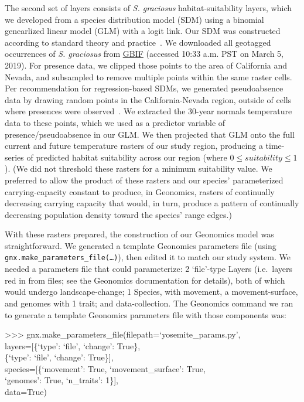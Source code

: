 ﻿\documentclass{article}
\newenvironment{allintypewriter}{\ttfamily}{\par}
\begin{document}
The second set of layers consists of \emph{S. graciosus} habitat-suitability layers, which
we developed from a species distribution model (SDM) using a
binomial genearlized linear model (GLM) with a logit link.
Our SDM was constructed according to standard theory and practice~\cite{peterson}.
We downloaded all geotagged occurrences of \emph{S. graciosus} from \href{https://www.gbif.org}{GBIF}
(accessed 10:33 a.m. PST on March 5, 2019).
For presence data, we clipped those points to the area of California and Nevada,
and subsampled to remove multiple points within the same raster cells.
Per recommendation for regression-based SDMs, we generated pseudoabsence data by drawing random points
in the California-Nevada region, outside of cells where presences were observed~\cite{barbet-massin}.
We extracted the 30-year normals temperature data to these points, which we used as a predictor
variable of presence/pseudoabsence in our GLM.
We then projected that GLM onto the full current and future temperature rasters of our study region,
producing a time-series of predicted habitat suitability across our region
(where $0 \leq suitability \leq 1$).
(We did not threshold these rasters for a minimum suitability value.
We preferred to allow the product of these rasters and our species'
parameterized carrying-capacity constant to produce, in Geonomics, rasters of
continually decreasing carrying capacity that would, in turn,
produce a pattern of continually decreasing population density toward the species' range edges.)

With these rasters prepared, the construction of our Geonomics model was straightforward.
We generated a template Geonomics parameters file
(using \texttt{gnx.make\_parameters\_file(\ldots)}),
then edited it to match our study system.
We needed a parameters file that could parameterize: 2 `file'-type Layers
(i.e.\ layers red in from files; see the Geonomics documentation for details),
both of which would undergo landscape-change;
1 Species, with movement, a movement-surface, and genomes with 1 trait;
and data-collection.
The Geonomics command we ran to generate a template Geonomics parameters
file with those components was:

\begin{allintypewriter}
>>> gnx.make\_parameters\_file(filepath=`yosemite\_params.py',\\
                               layers=[\{`type': `file', `change': True\},\\
                                       \{`type': `file', `change': True\}],\\
                               species=[\{`movement': True, `movement\_surface': True,\\
                                          `genomes': True, `n\_traits': 1\}],\\
                               data=True)\\
\end{allintypewriter}
\end{document}

